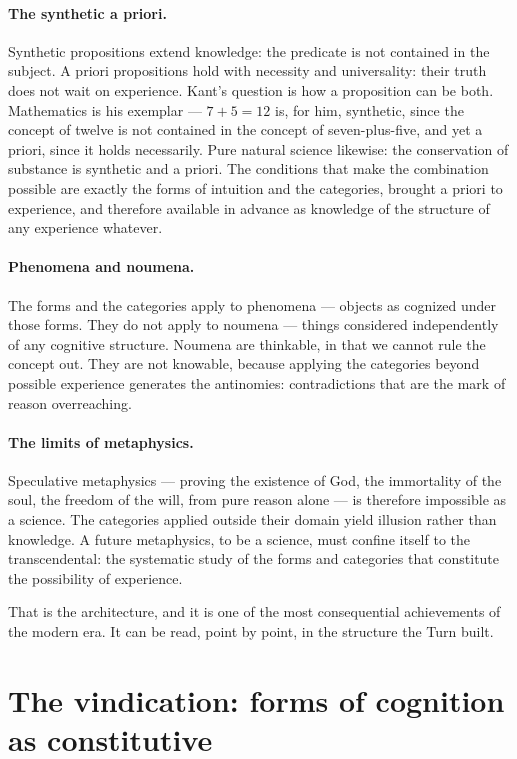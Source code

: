 \paragraph{The synthetic a priori.}
Synthetic propositions extend knowledge: the predicate is not
contained in the subject.
A priori propositions hold with necessity and universality: their
truth does not wait on experience.
Kant's question is how a proposition can be both.
Mathematics is his exemplar --- $7+5=12$ is, for him, synthetic,
since the concept of twelve is not contained in the concept of
seven-plus-five, and yet a priori, since it holds necessarily.
Pure natural science likewise: the conservation of substance is
synthetic and a priori.
The conditions that make the combination possible are exactly the
forms of intuition and the categories, brought a priori to
experience, and therefore available in advance as knowledge of the
structure of any experience whatever.

\paragraph{Phenomena and noumena.}
The forms and the categories apply to phenomena --- objects as
cognized under those forms.
They do not apply to noumena --- things considered independently of
any cognitive structure.
Noumena are thinkable, in that we cannot rule the concept out.
They are not knowable, because applying the categories beyond
possible experience generates the antinomies: contradictions that
are the mark of reason overreaching.

\paragraph{The limits of metaphysics.}
Speculative metaphysics --- proving the existence of God, the
immortality of the soul, the freedom of the will, from pure reason
alone --- is therefore impossible as a science.
The categories applied outside their domain yield illusion rather
than knowledge.
A future metaphysics, to be a science, must confine itself to the
transcendental: the systematic study of the forms and categories
that constitute the possibility of experience.

That is the architecture, and it is one of the most consequential
achievements of the modern era.
It can be read, point by point, in the structure the Turn built.

\section{The vindication: forms of cognition as constitutive}
\label{sec:kant-vindication}

